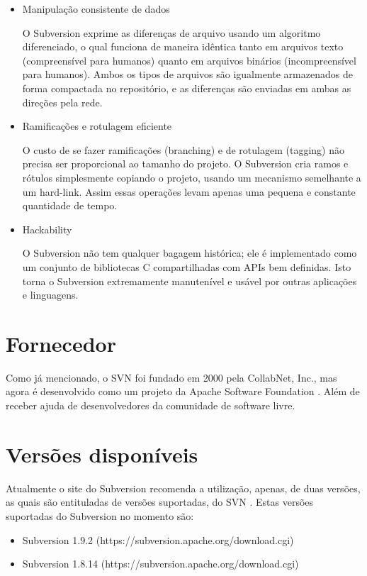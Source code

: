 \begin{itemize}
  \item Manipulação consistente de dados

  O Subversion exprime as diferenças de arquivo usando um algoritmo diferenciado, o qual funciona de maneira idêntica tanto em arquivos texto (compreensível para humanos) quanto em arquivos binários (incompreensível para humanos). Ambos os tipos de arquivos são igualmente armazenados de forma compactada no repositório, e as diferenças são enviadas em ambas as direções pela rede.

  \item Ramificações e rotulagem eficiente

  O custo de se fazer ramificações (branching) e de rotulagem (tagging) não precisa ser proporcional ao tamanho do projeto. O Subversion cria ramos e rótulos simplesmente copiando o projeto, usando um mecanismo semelhante a um hard-link. Assim essas operações levam apenas uma pequena e constante quantidade de tempo.

  \item Hackability

  O Subversion não tem qualquer bagagem histórica; ele é implementado como um conjunto de bibliotecas C compartilhadas com APIs bem definidas. Isto torna o Subversion extremamente manutenível e usável por outras aplicações e linguagens.

  \end{itemize}

\section{Fornecedor}

  Como já mencionado, o SVN foi fundado em 2000 pela CollabNet, Inc., mas agora é desenvolvido como um projeto da Apache Software Foundation \cite{svn-site-home}. Além de receber ajuda de desenvolvedores da comunidade de software livre.

\section{Versões disponíveis}

  Atualmente o site do Subversion recomenda a utilização, apenas, de duas versões, as quais são entituladas de versões suportadas, do SVN \cite{svn-site}. Estas versões suportadas do Subversion no momento são:

  \begin{itemize}
    \item Subversion 1.9.2 (https://subversion.apache.org/download.cgi)

    \item Subversion 1.8.14 (https://subversion.apache.org/download.cgi)

  \end{itemize}

